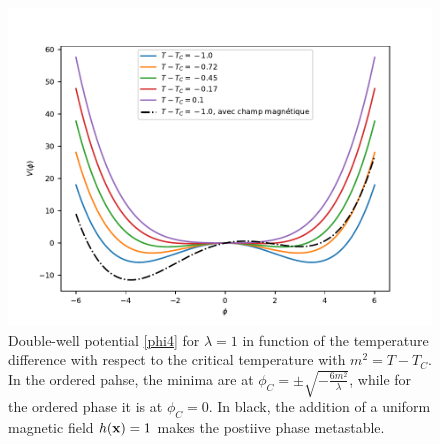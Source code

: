 \begin{figure}
    \centering
    \includegraphics[width=0.6\linewidth]{intro/double-puit-en-fonction-temp.pdf}
    \caption{Double-well potential \eqref{phi4} for $\lambda=1$ in function of the temperature difference with respect to the critical temperature with $m^2 = T-T_C$. In the ordered pahse, the minima are at $\phi_C =\pm \sqrt{- \frac{6 m^2}{\lambda} } $, while for the ordered phase it is at $\phi_C = 0$. In black, the addition of a uniform magnetic field  $h({\bf x}) = 1$ makes the postiive phase metastable.}
    \label{double-puits-temperature}
\end{figure}

